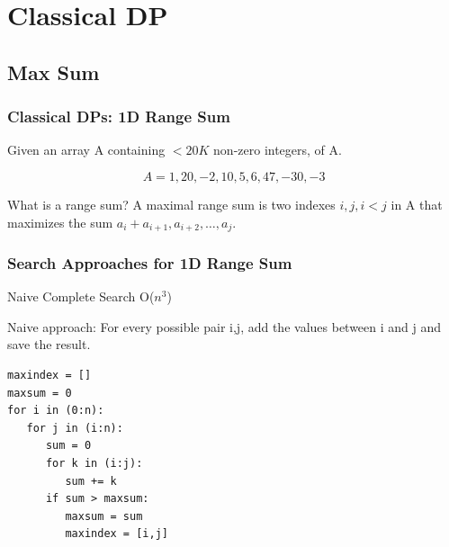\documentclass{beamer}
\begin{document}


\section{Classical DP}
\subsection{Max Sum}

\begin{frame}
  \frametitle{Classical DPs: 1D Range Sum}

  Given an array A containing $< 20K$ non-zero integers,
   of A.

  \begin{equation*}
    A = { 1, 20, -2, 10, 5, 6, 47, -30, -3}
  \end{equation*}

  \vfill
  
  \begin{block}{What is a range sum?}
    A maximal range sum is two indexes $i,j, i < j$ in A that maximizes
    the sum $a_i + a_{i+1}, a_{i+2}, \ldots, a_j$.
  \end{block}
\end{frame}

\begin{frame}
  \frametitle{Search Approaches for 1D Range Sum}
  \begin{block}{Naive Complete Search O($n^3$)}

    Naive approach: For every possible pair i,j, add the values
    between i and j and save the result.

{\smaller
\begin{verbatim}
maxindex = []
maxsum = 0
for i in (0:n):
   for j in (i:n):
      sum = 0
      for k in (i:j):
         sum += k
      if sum > maxsum:
         maxsum = sum
         maxindex = [i,j]
\end{verbatim}
}
  \end{block}
\end{frame}
\end{document}

